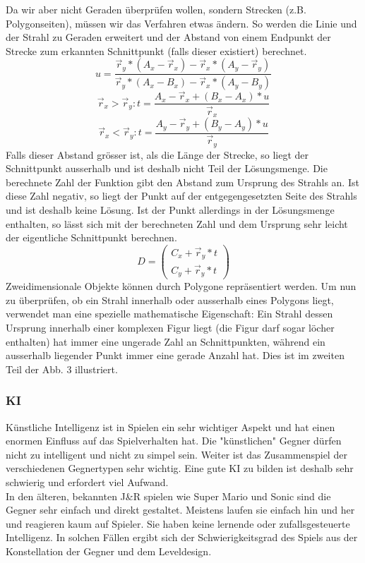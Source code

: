 \documentclass[12pt,a4paper,titlepage]{article}
\begin{document}
			Da wir aber nicht Geraden überprüfen wollen, sondern Strecken (z.B. Polygonseiten), müssen wir das Verfahren etwas ändern. So werden die Linie und der Strahl zu Geraden erweitert und der Abstand von einem Endpunkt der Strecke zum erkannten Schnittpunkt (falls dieser existiert) berechnet. 
			$$u=\frac{\vec{r}_y*(A_x-\vec{r}_x)-\vec{r}_x*(A_y-\vec{r}_y)}{\vec{r}_y*(A_x-B_x)-\vec{r}_x*(A_y-B_y)}$$
			$$\vec{r}_x > \vec{r}_y : t=\frac{A_x-\vec{r}_x+(B_x-A_x)*u}{\vec{r}_x}$$
			$$\vec{r}_x < \vec{r}_y : t=\frac{A_y-\vec{r}_y+(B_y-A_y)*u}{\vec{r}_y}$$
			Falls dieser Abstand grösser ist, als die Länge der Strecke, so liegt der Schnittpunkt ausserhalb und ist deshalb nicht Teil der Lösungsmenge. Die berechnete Zahl der Funktion gibt den Abstand zum Ursprung des Strahls an. Ist diese Zahl negativ, so liegt der Punkt auf der entgegengesetzten Seite des Strahls und ist deshalb keine Lösung. Ist der Punkt allerdings in der Lösungsmenge enthalten, so lässt sich mit der berechneten Zahl und dem Ursprung sehr leicht der eigentliche Schnittpunkt berechnen.\\
			$$D=\begin{pmatrix}C_x+\vec{r}_y*t\\C_y+\vec{r}_y*t\end{pmatrix}$$
			Zweidimensionale Objekte können durch Polygone repräsentiert werden. Um nun zu überprüfen, ob ein Strahl innerhalb oder ausserhalb eines Polygons liegt, verwendet man eine spezielle mathematische Eigenschaft: Ein Strahl dessen Ursprung innerhalb einer komplexen Figur liegt (die Figur darf sogar löcher enthalten) hat immer eine ungerade Zahl an Schnittpunkten, während ein ausserhalb liegender Punkt immer eine gerade Anzahl hat. Dies ist im zweiten Teil der Abb. 3 illustriert.
			
		\subsubsection{KI}
			Künstliche Intelligenz ist in Spielen ein sehr wichtiger Aspekt und hat einen enormen Einfluss auf das Spielverhalten hat. Die "künstlichen" Gegner dürfen nicht zu intelligent und nicht zu simpel sein. Weiter ist das Zusammenspiel der verschiedenen Gegnertypen sehr wichtig. Eine gute KI zu bilden ist deshalb sehr schwierig und erfordert viel Aufwand.\\
			
			In den älteren, bekannten J\&R spielen wie Super Mario und Sonic sind die Gegner sehr einfach und direkt gestaltet. Meistens laufen sie einfach hin und her und reagieren kaum auf Spieler. Sie haben keine lernende oder zufallsgesteuerte Intelligenz. In solchen Fällen ergibt sich der Schwierigkeitsgrad des Spiels aus der Konstellation der Gegner und dem Leveldesign.\\
			
\end{document}
